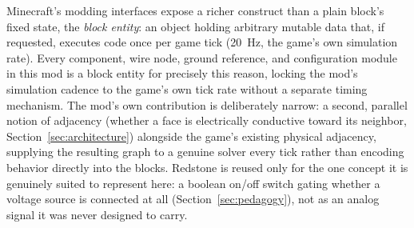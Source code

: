 Minecraft's modding interfaces expose a richer construct than a plain block's fixed state,
the \emph{block entity}: an object holding arbitrary mutable data that, if requested, executes
code once per game tick (20~Hz, the game's own simulation rate). Every component, wire node,
ground reference, and configuration module in this mod is a block entity for precisely this
reason, locking the mod's simulation cadence to the game's own tick rate without a separate
timing mechanism. The mod's own contribution is deliberately narrow: a second, parallel
notion of adjacency (whether a face is electrically conductive toward its neighbor,
Section~\ref{sec:architecture}) alongside the game's existing physical adjacency, supplying
the resulting graph to a genuine solver every tick rather than encoding behavior directly
into the blocks. Redstone is reused only for the one concept it is genuinely suited to
represent here: a boolean on/off switch gating whether a voltage source is connected at all
(Section~\ref{sec:pedagogy}), not as an analog signal it was never designed to carry.
